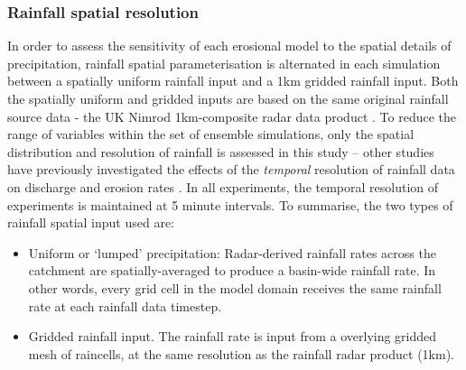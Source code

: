 
\subsubsection{Rainfall spatial resolution}
In order to assess the sensitivity of each erosional model to the spatial details of precipitation, rainfall spatial parameterisation is alternated in each simulation between a spatially uniform rainfall input and a 1km gridded rainfall input. Both the spatially uniform and gridded inputs are based on the same original rainfall source data - the UK Nimrod 1km-composite radar data product \citep{metoffice2003nimrod}. To reduce the range of variables within the set of ensemble simulations, only the spatial distribution and resolution of rainfall is assessed in this study -- other studies have previously investigated the effects of the \textit{temporal} resolution of rainfall data on discharge and erosion rates \citep{nicotina2008impact,Coulthard2013,coulthard2016sensitivity}. In all experiments, the temporal resolution of experiments is maintained at 5 minute intervals. To summarise, the two types of rainfall spatial input used are: 

\begin{itemize}
\item Uniform or `lumped' precipitation: Radar-derived rainfall rates across the catchment are spatially-averaged to produce a basin-wide rainfall rate. In other words, every grid cell in the model domain receives the same rainfall rate at each rainfall data timestep.
\item Gridded rainfall input. The rainfall rate is input from a overlying gridded mesh of raincells, at the same resolution as the rainfall radar product (1km).
\end{itemize}


